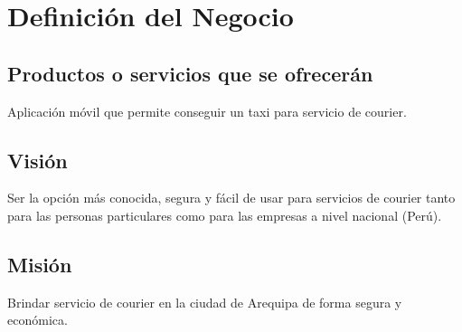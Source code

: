 \chapter{Definición del Negocio}

\section{Productos o servicios que se ofrecerán}

Aplicación móvil que permite conseguir un taxi para servicio de courier.


\section{Visión}

Ser la opción más conocida, segura y fácil de usar para servicios de courier tanto para las personas particulares como para las empresas a nivel nacional (Perú).

\section{Misión}

Brindar servicio de courier en la ciudad de Arequipa de forma segura y económica.
